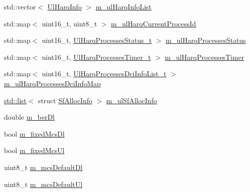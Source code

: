 \begin{DoxyCompactItemize}
\item 
std\+::vector$<$ \hyperlink{structns3_1_1UlHarqInfo}{Ul\+Harq\+Info} $>$ \hyperlink{classns3_1_1MmWaveFlexTtiMaxWeightMacScheduler_ad0c6ce6c255be4838fe693c7c1934598}{m\+\_\+ul\+Harq\+Info\+List}
\item 
std\+::map$<$ uint16\+\_\+t, uint8\+\_\+t $>$ \hyperlink{classns3_1_1MmWaveFlexTtiMaxWeightMacScheduler_aca59b79a3de0ed0718029f3167542a54}{m\+\_\+ul\+Harq\+Current\+Process\+Id}
\item 
std\+::map$<$ uint16\+\_\+t, \hyperlink{classns3_1_1MmWaveFlexTtiMaxWeightMacScheduler_a99865f7f1fd7470360def81114cae540}{Ul\+Harq\+Processes\+Status\+\_\+t} $>$ \hyperlink{classns3_1_1MmWaveFlexTtiMaxWeightMacScheduler_aeff65837d6604471dd667bfe89240de2}{m\+\_\+ul\+Harq\+Processes\+Status}
\item 
std\+::map$<$ uint16\+\_\+t, \hyperlink{classns3_1_1MmWaveFlexTtiMaxWeightMacScheduler_ab0bdc7347f33c61be33360a35c914a71}{Ul\+Harq\+Processes\+Timer\+\_\+t} $>$ \hyperlink{classns3_1_1MmWaveFlexTtiMaxWeightMacScheduler_aa609a40ebf5eb905696d2db4e1443961}{m\+\_\+ul\+Harq\+Processes\+Timer}
\item 
std\+::map$<$ uint16\+\_\+t, \hyperlink{classns3_1_1MmWaveFlexTtiMaxWeightMacScheduler_a875ba9f6447e66b3ce77565ab142db4a}{Ul\+Harq\+Processes\+Dci\+Info\+List\+\_\+t} $>$ \hyperlink{classns3_1_1MmWaveFlexTtiMaxWeightMacScheduler_a637f826b85b2eeb88c80b53b468fdfcf}{m\+\_\+ul\+Harq\+Processes\+Dci\+Info\+Map}
\item 
\hyperlink{openflow-interface_8h_afd9bcfa176617760671b67580f536fa7}{std\+::list}$<$ struct \hyperlink{structns3_1_1SfAllocInfo}{Sf\+Alloc\+Info} $>$ \hyperlink{classns3_1_1MmWaveFlexTtiMaxWeightMacScheduler_aeb4d461c79d2d87a25eb368f77a2accf}{m\+\_\+ul\+Sf\+Alloc\+Info}
\item 
double \hyperlink{classns3_1_1MmWaveFlexTtiMaxWeightMacScheduler_af1c8b3bed540a69489168f57af6ab0a9}{m\+\_\+ber\+Dl}
\item 
bool \hyperlink{classns3_1_1MmWaveFlexTtiMaxWeightMacScheduler_abb5583e84ade8989145fffde5a7b7e05}{m\+\_\+fixed\+Mcs\+Dl}
\item 
bool \hyperlink{classns3_1_1MmWaveFlexTtiMaxWeightMacScheduler_a81c87e383d372309a5ccde6588636bba}{m\+\_\+fixed\+Mcs\+Ul}
\item 
uint8\+\_\+t \hyperlink{classns3_1_1MmWaveFlexTtiMaxWeightMacScheduler_a5251abb5991c06c345317bc7d5ff32e8}{m\+\_\+mcs\+Default\+Dl}
\item 
uint8\+\_\+t \hyperlink{classns3_1_1MmWaveFlexTtiMaxWeightMacScheduler_a2b31e4f4780db286026e2e8a74f468b2}{m\+\_\+mcs\+Default\+Ul}

\end{DoxyCompactItemize}
